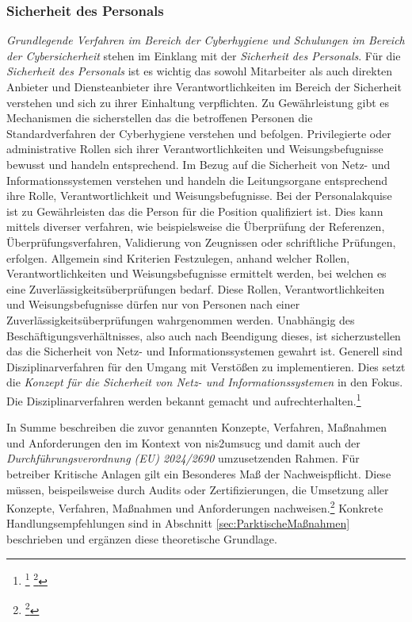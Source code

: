 \documentclass[11pt,a4paper,hidelinks]{article}   %
\begin{document}
            \subsubsection{Sicherheit des Personals}
            \emph{Grundlegende Verfahren im Bereich der Cyberhygiene und Schulungen im Bereich der Cybersicherheit} stehen im Einklang mit der \emph{Sicherheit des Personals}. Für die \emph{Sicherheit des Personals} ist es wichtig das sowohl Mitarbeiter als auch direkten Anbieter und Diensteanbieter ihre Verantwortlichkeiten im Bereich der Sicherheit verstehen und sich zu ihrer Einhaltung verpflichten. Zu Gewährleistung gibt es Mechanismen die sicherstellen das die betroffenen Personen die Standardverfahren der Cyberhygiene verstehen und befolgen. Privilegierte oder administrative Rollen sich ihrer Verantwortlichkeiten und Weisungsbefugnisse bewusst und handeln entsprechend. Im Bezug auf die Sicherheit von Netz- und Informationssystemen verstehen und handeln die Leitungsorgane entsprechend ihre Rolle, Verantwortlichkeit und Weisungsbefugnisse. Bei der Personalakquise ist zu Gewährleisten das die Person für die Position qualifiziert ist. Dies kann mittels diverser verfahren, wie beispielsweise die Überprüfung der   Referenzen, Überprüfungsverfahren, Validierung von Zeugnissen oder schriftliche Prüfungen, erfolgen. Allgemein sind Kriterien Festzulegen, anhand welcher Rollen, Verantwortlichkeiten und Weisungsbefugnisse ermittelt werden, bei welchen es eine Zuverlässigkeitsüberprüfungen bedarf. Diese Rollen, Verantwortlichkeiten und Weisungsbefugnisse dürfen nur von Personen nach einer Zuverlässigkeitsüberprüfungen wahrgenommen werden. Unabhängig des Beschäftigungsverhältnisses, also auch nach Beendigung dieses, ist sicherzustellen das die Sicherheit von Netz- und Informationssystemen gewahrt ist. Generell sind Disziplinarverfahren für den Umgang mit Verstößen zu implementieren. Dies setzt die \emph{Konzept für die Sicherheit von Netz- und Informationssystemen} in den Fokus. Die Disziplinarverfahren werden bekannt gemacht und aufrechterhalten.\footnote{
                \footcite[Vgl. Nummer 8,][, Anhang]{EU2024-2690}
                \footcite[Vgl. §30 Absatz 2, Nummer 7 und 9,][]{NIS2UmsuCG} %
            }\medbreak

            In Summe beschreiben die zuvor genannten Konzepte, Verfahren, Maßnahmen und Anforderungen den im Kontext von \gls{nis2umsucg} und damit auch der \emph{Durchführungsverordnung (EU) 2024/2690} umzusetzenden Rahmen. Für betreiber Kritische Anlagen gilt ein Besonderes Maß der Nachweispflicht. Diese müssen, beispeilsweise durch Audits oder Zertifizierungen, die Umsetzung aller Konzepte, Verfahren, Maßnahmen und Anforderungen nachweisen.\footnote{\footcite[Vgl. §39,][]{NIS2UmsuCG}} Konkrete Handlungsempfehlungen sind in Abschnitt \ref{sec:ParktischeMaßnahmen} beschrieben und ergänzen diese theoretische Grundlage.
            
\end{document}
